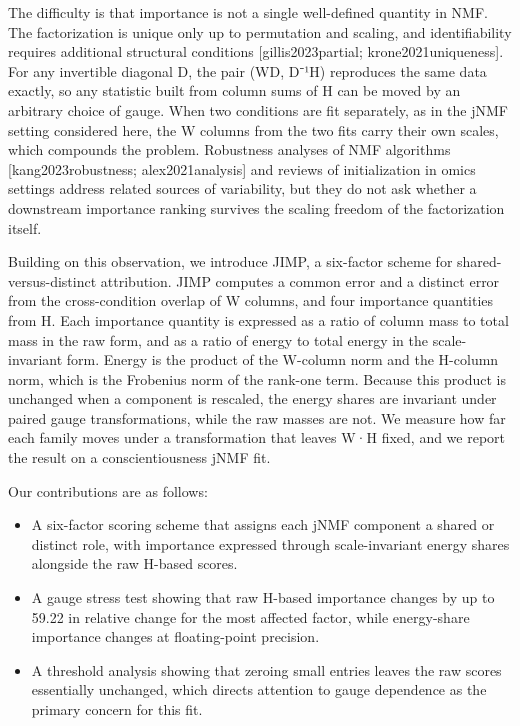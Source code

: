 \documentclass{article}
\begin{document}
The difficulty is that importance is not a single well-defined quantity in NMF. The factorization is unique only up to permutation and scaling, and identifiability requires additional structural conditions [gillis2023partial; krone2021uniqueness]. For any invertible diagonal D, the pair (WD, D⁻¹H) reproduces the same data exactly, so any statistic built from column sums of H can be moved by an arbitrary choice of gauge. When two conditions are fit separately, as in the jNMF setting considered here, the W columns from the two fits carry their own scales, which compounds the problem. Robustness analyses of NMF algorithms [kang2023robustness; alex2021analysis] and reviews of initialization in omics settings address related sources of variability, but they do not ask whether a downstream importance ranking survives the scaling freedom of the factorization itself.

Building on this observation, we introduce JIMP, a six-factor scheme for shared-versus-distinct attribution. JIMP computes a common error and a distinct error from the cross-condition overlap of W columns, and four importance quantities from H. Each importance quantity is expressed as a ratio of column mass to total mass in the raw form, and as a ratio of energy to total energy in the scale-invariant form. Energy is the product of the W-column norm and the H-column norm, which is the Frobenius norm of the rank-one term. Because this product is unchanged when a component is rescaled, the energy shares are invariant under paired gauge transformations, while the raw masses are not. We measure how far each family moves under a transformation that leaves W·H fixed, and we report the result on a conscientiousness jNMF fit.

Our contributions are as follows:

\begin{itemize}
 \item A six-factor scoring scheme that assigns each jNMF component a shared or distinct role, with importance expressed through scale-invariant energy shares alongside the raw H-based scores.
 \item A gauge stress test showing that raw H-based importance changes by up to 59.22 in relative change for the most affected factor, while energy-share importance changes at floating-point precision.
 \item A threshold analysis showing that zeroing small entries leaves the raw scores essentially unchanged, which directs attention to gauge dependence as the primary concern for this fit.
\end{itemize}
\end{document}
